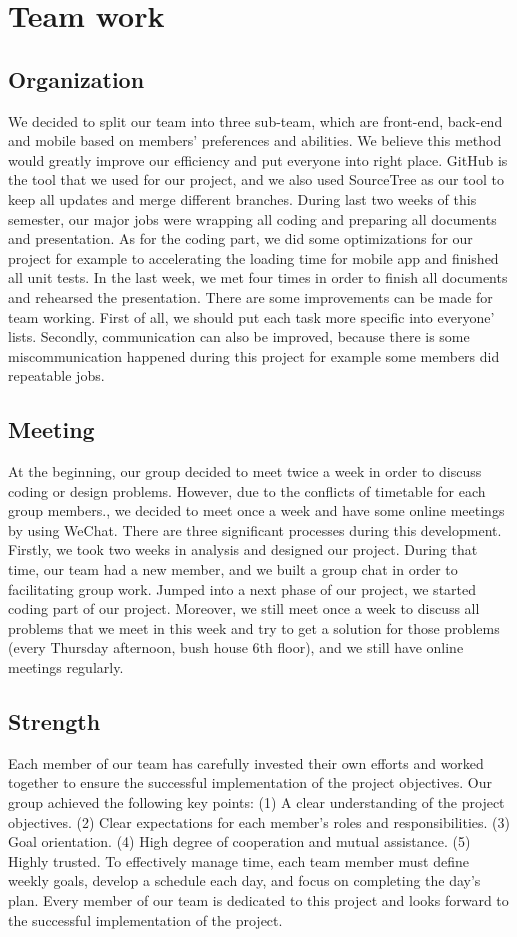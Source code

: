 \documentclass[12pt,a4]{article}
\begin{document}
\section{Team work}\label{5}
\subsection{Organization}\label{5.1}
We decided to split our team into three sub-team, which are front-end, back-end and mobile based on members' preferences and abilities. We believe this method would greatly improve our efficiency and put everyone into right place. GitHub is the tool that we used for our project, and we also used SourceTree as our tool to keep all updates and merge different branches. During last two weeks of this semester, our major jobs were wrapping all coding and preparing all documents and presentation. As for the coding part, we did some optimizations for our project for example to accelerating the loading time for mobile app and finished all unit tests. In the last week, we met four times in order to finish all documents and rehearsed the presentation. There are some improvements can be made for team working. First of all, we should put each task more specific into everyone' lists. Secondly, communication can also be improved, because there is some miscommunication happened during this project for example some members did repeatable jobs.
\subsection{Meeting}\label{5.2}	
At the beginning, our group decided to meet twice a week in order to discuss coding or design problems. However, due to the conflicts of timetable for each group members., we decided to meet once a week and have some online meetings by using WeChat. There are three significant processes during this development. Firstly, we took two weeks in analysis and designed our project. During that time, our team had a new member, and we built a group chat in order to facilitating group work. Jumped into a next phase of our project, we started coding part of our project. Moreover, we still meet once a week to discuss all problems that we meet in this week and try to get a solution for those problems (every Thursday afternoon, bush house 6th floor), and we still have online meetings regularly.

\subsection{Strength}\label{5.3}	
Each member of our team has carefully invested their own efforts and worked together to ensure the successful implementation of the project objectives. Our group achieved the following key points:
(1) A clear understanding of the project objectives.
(2) Clear expectations for each member's roles and responsibilities.
(3) Goal orientation.
(4) High degree of cooperation and mutual assistance.
(5) Highly trusted.
To effectively manage time, each team member must define weekly goals, develop a schedule each day, and focus on completing the day's plan. Every member of our team is dedicated to this project and looks forward to the successful implementation of the project.
\end{document}
